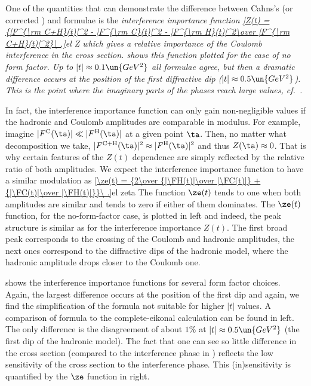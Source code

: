 One of the quantities that can demonstrate the difference between Cahns's (or corrected \KL) and \WY{} formulae is the \em{interference importance} function
\eqref{Z(t) = {|F^{\rm C+H}(t)|^2 - |F^{\rm C}(t)|^2 - |F^{\rm H}(t)|^2\over |F^{\rm C+H}(t)|^2}\ ,}{el Z}
which gives a relative importance of the Coulomb interference in the cross section.  shows this function plotted for the case of no form factor. Up to $|t| \approx 0.1\un{GeV^2}$ all formulae agree, but then a dramatic difference occurs at the position of the first diffractive dip ($|t|\approx 0.5\un{GeV^2}$). This is the point where the imaginary parts of the phases reach large values, cf.~.


In fact, the interference importance function can only gain non-negligible values if the hadronic and Coulomb amplitudes are comparable in modulus. For example, imagine $|\FC(\ta)| \ll |\FH(\ta)|$ at a given point $\ta$. Then, no matter what decomposition  we take, $|\FCH(\ta)|^2 \approx |\FH(\ta)|^2$ and thus $Z(\ta) \approx 0$. That is why certain features of the $Z(t)$ dependence are simply reflected by the relative ratio of both amplitudes. We expect the interference importance function to have a similar modulation as 
\eqref{\ze(t) = {2\over {|\FH(t)|\over |\FC(t)|} + {|\FC(t)|\over |\FH(t)|}}\ .}{el zeta}
The function $\ze(t)$ tends to one when both amplitudes are similar and tends to zero if either of them dominates. The $\ze(t)$ function, for the no-form-factor case, is plotted in  left and indeed, the peak structure is similar as for the interference importance $Z(t)$. The first broad peak corresponds to the crossing of the Coulomb and hadronic amplitudes, the next ones correspond to the diffractive dips of the hadronic model, where the hadronic amplitude drops closer to the Coulomb one.

 shows the interference importance functions for several form factor choices. Again, the largest difference occurs at the position of the first dip and again, we find the simplification of the \WaY{} formula not suitable for higher $|t|$ values. A comparison of \KL{} formula to the complete-eikonal calculation can be found in  left. The only difference is the disagreement of about $1\%$ at $|t| \approx 0.5\un{GeV^2}$ (the first dip of the hadronic model). The fact that one can see so little difference in the cross section (compared to the interference phase in ) reflects the low sensitivity of the cross section to the interference phase. This (in)sensitivity is quantified by the $\ze$ function in  right.


